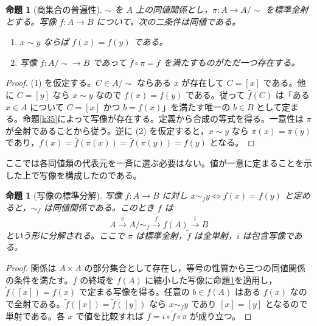 \documentclass[a5paper,10pt,dvipdfmx]{jsarticle}
\theoremstyle{definition}
\theoremstyle{plain}
\newtheorem{prop}[ruledef]{命題}
\newcommand{\iffc}{\Longleftrightarrow}
\begin{document}
\begin{prop}[商集合の普遍性]\label{k55}
$\sim$ を $A$ 上の同値関係とし，$\pi:A\to A/{\sim}$ を標準全射とする。写像 $f:A\to B$ について，次の二条件は同値である。
\begin{enumerate}
\item $x\sim y$ ならば $f(x)=f(y)$ である。
\item 写像 $\bar f:A/{\sim}\to B$ であって $\bar f\circ\pi=f$ を満たすものがただ一つ存在する。
\end{enumerate}
\end{prop}
\begin{proof}
(1) を仮定する。$C\in A/{\sim}$ ならある $x$ が存在して $C=[x]$ である。他に $C=[y]$ なら $x\sim y$ なので $f(x)=f(y)$ である。従って $\bar f(C)$ は「ある $x\in A$ について $C=[x]$ かつ $b=f(x)$」を満たす唯一の $b\in B$ として定まる。命題\ref{k35}によって写像が存在する。定義から合成の等式を得る。一意性は $\pi$ が全射であることから従う。逆に (2) を仮定すると，$x\sim y$ なら $\pi(x)=\pi(y)$ であり，$f(x)=\bar f(\pi(x))=\bar f(\pi(y))=f(y)$ となる。
\end{proof}
ここでは各同値類の代表元を一斉に選ぶ必要はない。値が一意に定まることを示した上で写像を構成したのである。
\begin{prop}[写像の標準分解]\label{k56}
写像 $f:A\to B$ に対し $x\sim_f y\iffc f(x)=f(y)$ と定めると，$\sim_f$ は同値関係である。このとき $f$ は
\[
 A\xrightarrow{\pi} A/{\sim_f}
 \xrightarrow{\widetilde f} f(A)
 \xrightarrow{i} B
\]
という形に分解される。ここで $\pi$ は標準全射，$\widetilde f$ は全単射，$i$ は包含写像である。
\end{prop}
\begin{proof}
関係は $A\times A$ の部分集合として存在し，等号の性質から三つの同値関係の条件を満たす。$f$ の終域を $f(A)$ に縮小した写像に命題\ref{k55}を適用し，$\widetilde f([x])=f(x)$ で定まる写像を得る。任意の $b\in f(A)$ はある $f(x)$ なので全射である。$\widetilde f([x])=\widetilde f([y])$ なら $x\sim_f y$ であり $[x]=[y]$ となるので単射である。各 $x$ で値を比較すれば $f=i\circ\widetilde f\circ\pi$ が成り立つ。
\end{proof}
\end{document}
